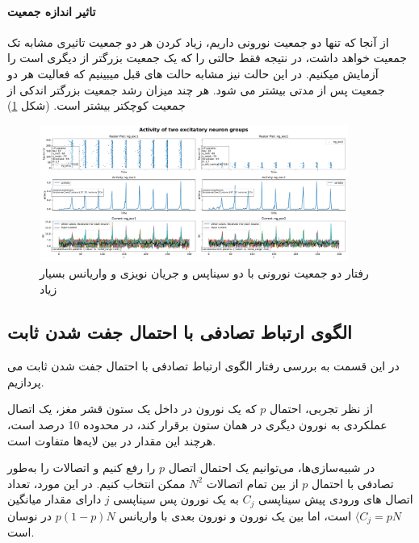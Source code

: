 \documentclass{report}
\begin{document}
            \paragraph*{تاثیر اندازه جمعیت}
            از آنجا که تنها دو جمعیت نورونی داریم، زیاد کردن هر دو جمعیت تاثیری مشابه تک جمعیت خواهد داشت، در نتیجه فقط حالتی را که یک جمعیت بزرگتر از دیگری است را آزمایش میکنیم. در این حالت نیز مشابه حالت های قبل میبینیم که فعالیت هر دو جمعیت پس از مدتی بیشتر می شود. هر چند میزان رشد جمعیت بزرگتر اندکی از جمعیت کوچکتر بیشتر است.
            (شکل \ref{fig:part2-two-ng-full-synapse-diff-size-noise-curr})
            \begin{figure}[!ht]
                \centering
                \includegraphics[width=0.9\textwidth]{plots/part2-two-ng-full-synapse-diff-size-noise-curr.pdf} 
                \caption{رفتار دو جمعیت نورونی با دو سیناپس و جریان نویزی و واریانس بسیار زیاد}
                \label{fig:part2-two-ng-full-synapse-diff-size-noise-curr}
            \end{figure}


    \subsection{الگوی ارتباط تصادفی با احتمال جفت شدن ثابت}
        در این قسمت به بررسی رفتار الگوی ارتباط تصادفی با احتمال جفت شدن ثابت می پردازیم. 

        از نظر تجربی، احتمال 
        $p$
        که یک نورون در داخل یک ستون قشر مغز، یک اتصال عملکردی به نورون دیگری در همان ستون برقرار کند، در محدوده 10 درصد است، هرچند این مقدار در بین لایه‌ها متفاوت است.

        در شبیه‌سازی‌ها، می‌توانیم یک احتمال اتصال 
        $p$ 
        را رفع کنیم و اتصالات را به‌طور تصادفی با احتمال 
        $p$ 
        از بین تمام اتصالات 
        $N^2$ 
        ممکن انتخاب کنیم. در این مورد، تعداد اتصال های ورودی پیش سیناپسی 
        $C_j$
        به یک نورون پس سیناپسی 
        $j$
        دارای مقدار میانگین 
        $\langle C_j = pN$
        است، اما بین یک نورون و نورون بعدی با واریانس 
        $p(1-p)N$ 
        در نوسان است.
\end{document}
